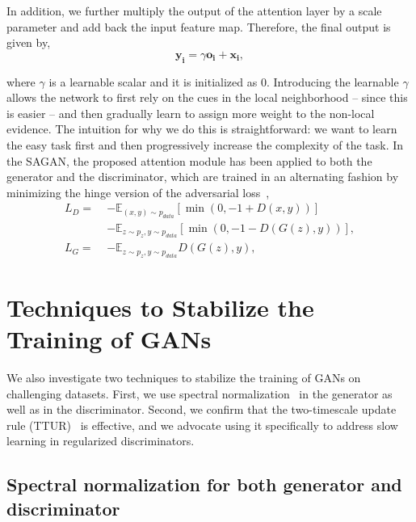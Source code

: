 \documentclass{article}
\begin{document}
In addition, we further multiply the output of the attention layer by a scale parameter and add back the input feature map. Therefore, the final output is given by, 
\begin{equation}\label{eq:attention_output}
\bm{y_i} = \gamma \bm{o_i} + \bm{x_i}, 
\end{equation}

where $\gamma$ is a learnable scalar and it is initialized as 0.
Introducing the learnable $\gamma$ allows the network to first rely on the cues in the local neighborhood -- since this is easier -- and then gradually learn to assign more weight to the non-local evidence.
The intuition for why we do this is straightforward: we want to learn the easy task first and then progressively increase the complexity of the task.
In the SAGAN, the proposed attention module has been applied to both the generator and the discriminator, which are trained in an alternating fashion by minimizing the hinge version of the adversarial loss~\cite{lim2017,Tran2017,Miyato18a},
\begin{equation}\label{eq:GAN_Loss}
\begin{aligned}
L_D = \; & -\mathbb{E}_{(x, y) \sim {p_{data}}} [\min(0, -1 + D(x, y))] \\ &- \mathbb{E}_{z \sim {p_{z}}, y \sim {p_{data}}} [\min(0, -1-D(G(z), y)) ], \\
L_G = \;  &-\mathbb{E}_{z \sim {p_{z}}, y \sim {p_{data}}} {D(G(z), y)},
\end{aligned}
\end{equation}






\section{Techniques to Stabilize the Training of GANs}

We also investigate two techniques to stabilize the training of GANs on challenging datasets.
First, we use spectral normalization~\cite{Miyato18a} in the generator as well as in the discriminator.
Second, we confirm that the two-timescale update rule (TTUR)~\cite{HeuselRUNH17} is effective, and we advocate using it specifically to address slow learning in regularized discriminators.



\subsection{Spectral normalization for both generator and discriminator}
\end{document}
